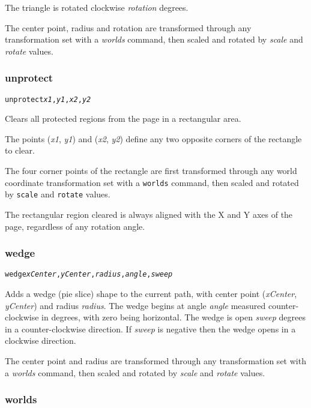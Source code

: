 The triangle is rotated clockwise \textit{rotation} degrees.

The center point, radius and rotation are transformed through any
transformation set with a \textit{worlds} command,
then scaled and rotated by \textit{scale}
and \textit{rotate} values.

\subsubsection{unprotect}

\begin{alltt}
unprotect \textit{x1}, \textit{y1}, \textit{x2}, \textit{y2}
\end{alltt}

Clears all protected regions from the page in a rectangular
area.

The points
(\textit{x1}, \textit{y1}) and (\textit{x2}, \textit{y2}) define
any two opposite corners of the rectangle to clear.

The four corner points of the rectangle
are first transformed through any world coordinate
transformation set with a \texttt{worlds} command,
then scaled and rotated by \texttt{scale}
and \texttt{rotate} values.

The rectangular region cleared is always aligned with the X
and Y axes of the page, regardless of any rotation angle.

\subsubsection{wedge}

\begin{alltt}
wedge \textit{xCenter}, \textit{yCenter}, \textit{radius}, \textit{angle}, \textit{sweep}
\end{alltt}

Adds a wedge (pie slice) shape to the current path, with center
point (\textit{xCenter}, \textit{yCenter}) and radius
\textit{radius}.
The wedge begins at angle \textit{angle} measured
counter-clockwise in degrees, with zero being horizontal.
The wedge is open \textit{sweep} degrees in a counter-clockwise direction.
If \textit{sweep} is negative then the wedge opens in a clockwise direction.

The center point and radius are transformed through any
transformation set with a \textit{worlds} command,
then scaled and rotated by \textit{scale}
and \textit{rotate} values.

\subsubsection{worlds}

